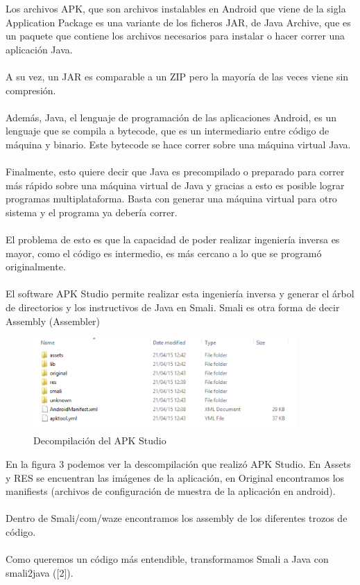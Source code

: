 Los archivos APK, que son archivos instalables en Android que viene de la sigla Application Package es una variante de los ficheros JAR, de Java Archive, que es un paquete que contiene los archivos necesarios para instalar o hacer correr una aplicación Java.
\\\\
A su vez, un JAR es comparable a un ZIP pero la mayoría de las veces viene sin compresión.
\\\\
    Además, Java, el lenguaje de programación de las aplicaciones Android, es un lenguaje que se compila a bytecode, que es un intermediario entre código de máquina y binario. Este bytecode se hace correr sobre una máquina virtual Java.
\\\\
Finalmente, esto quiere decir que Java es precompilado o preparado para correr más rápido sobre una máquina virtual de Java y gracias a esto es posible lograr programas multiplataforma. Basta con generar una máquina virtual para otro sistema y el programa ya debería correr.
\\\\
El problema de esto es que la capacidad de poder realizar ingeniería inversa es mayor, como el código es intermedio, es más cercano a lo que se programó originalmente.
\\\\
El software APK Studio permite realizar esta ingeniería inversa y generar el árbol de directorios y los instructivos de Java en Smali. Smali es otra forma de decir Assembly (Assembler)
    
        \begin{figure}[H]
  \begin{center}
    \includegraphics[width=0.9\textwidth]{imagenes/fig26.png}
    \caption{Decompilación del APK Studio}
  \end{center}
\end{figure}
    
En la figura 3 podemos ver la descompilación que realizó APK Studio. En Assets y RES se encuentran las imágenes de la aplicación, en Original encontramos los manifiests (archivos de configuración de muestra de la aplicación en android).
\\\\
Dentro de Smali/com/waze encontramos los assembly de los diferentes trozos de código.
\\\\
Como queremos un código más entendible, transformamos Smali a Java con smali2java ([2]).


